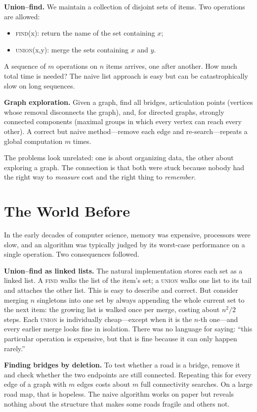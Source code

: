 \noindent\textbf{Union--find.} We maintain a collection of disjoint sets of items. Two operations are allowed:
\begin{itemize}
\item \textsc{find}(x): return the name of the set containing $x$;
\item \textsc{union}(x,y): merge the sets containing $x$ and $y$.
\end{itemize}
A sequence of $m$ operations on $n$ items arrives, one after another. How much total time is needed? The naive list approach is easy but can be catastrophically slow on long sequences.

\noindent\textbf{Graph exploration.} Given a graph, find all bridges, articulation points (vertices whose removal disconnects the graph), and, for directed graphs, strongly connected components (maximal groups in which every vertex can reach every other). A correct but naive method---remove each edge and re-search---repeats a global computation $m$ times.

The problems look unrelated: one is about organizing data, the other about exploring a graph. The connection is that both were stuck because nobody had the right way to \emph{measure} cost and the right thing to \emph{remember}.

\section{The World Before}
In the early decades of computer science, memory was expensive, processors were slow, and an algorithm was typically judged by its worst-case performance on a single operation. Two consequences followed.

\noindent\textbf{Union--find as linked lists.} The natural implementation stores each set as a linked list. A \textsc{find} walks the list of the item's set; a \textsc{union} walks one list to its tail and attaches the other list. This is easy to describe and correct. But consider merging $n$ singletons into one set by always appending the whole current set to the next item: the growing list is walked once per merge, costing about $n^2/2$ steps. Each \textsc{union} is individually cheap---except when it is the $n$-th one---and every earlier merge looks fine in isolation. There was no language for saying: ``this particular operation is expensive, but that is fine because it can only happen rarely.''

\noindent\textbf{Finding bridges by deletion.} To test whether a road is a bridge, remove it and check whether the two endpoints are still connected. Repeating this for every edge of a graph with $m$ edges costs about $m$ full connectivity searches. On a large road map, that is hopeless. The naive algorithm works on paper but reveals nothing about the structure that makes some roads fragile and others not.

